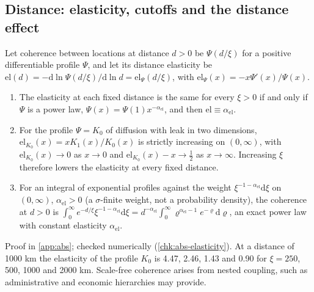 \subsection{Distance: elasticity, cutoffs and the distance effect}\label{sup:abs-distance-elasticity-cutoffs-and-the-dist}

\begin{proposition}\label{prop:abs-elasticity}
Let coherence between locations at distance $d>0$ be $\Psi(d/\xi)$ for a positive differentiable profile $\Psi$, and let its distance elasticity be $\mathrm{el}(d)=-\mathrm d\ln\Psi(d/\xi)/\mathrm d\ln d=\mathrm{el}_\Psi(d/\xi)$, with $\mathrm{el}_\Psi(x)=-x\Psi'(x)/\Psi(x)$.
\begin{enumerate}
\item[(a)] The elasticity at each fixed distance is the same for every $\xi>0$ if and only if $\Psi$ is a power law, $\Psi(x)=\Psi(1)x^{-\alpha_{\mathrm{el}}}$, and then $\mathrm{el}\equiv\alpha_{\mathrm{el}}$.
\item[(b)] For the profile $\Psi=K_0$ of diffusion with leak in two dimensions, $\mathrm{el}_{K_0}(x)=xK_1(x)/K_0(x)$ is strictly increasing on $(0,\infty)$, with $\mathrm{el}_{K_0}(x)\to0$ as $x\to0$ and $\mathrm{el}_{K_0}(x)-x\to\frac12$ as $x\to\infty$. Increasing $\xi$ therefore lowers the elasticity at every fixed distance.
\item[(c)] For an integral of exponential profiles against the weight $\xi^{-1-\alpha_{\mathrm{el}}}\mathrm d\xi$ on $(0,\infty)$, $\alpha_{\mathrm{el}}>0$ (a $\sigma$-finite weight, not a probability density), the coherence at $d>0$ is $\int_0^\infty e^{-d/\xi}\xi^{-1-\alpha_{\mathrm{el}}}\mathrm d\xi=d^{-\alpha_{\mathrm{el}}}\int_0^\infty\varrho^{\alpha_{\mathrm{el}}-1}e^{-\varrho}\mathrm d\varrho$, an exact power law with constant elasticity $\alpha_{\mathrm{el}}$.
\end{enumerate}
\end{proposition}

Proof in \cref{app:abs}; checked numerically (\cref{chk:abs-elasticity}). At a distance of 1000 km the elasticity of the profile $K_0$ is 4.47, 2.46, 1.43 and 0.90 for $\xi=250$, 500, 1000 and 2000 km. Scale-free coherence arises from nested coupling, such as administrative and economic hierarchies may provide.

